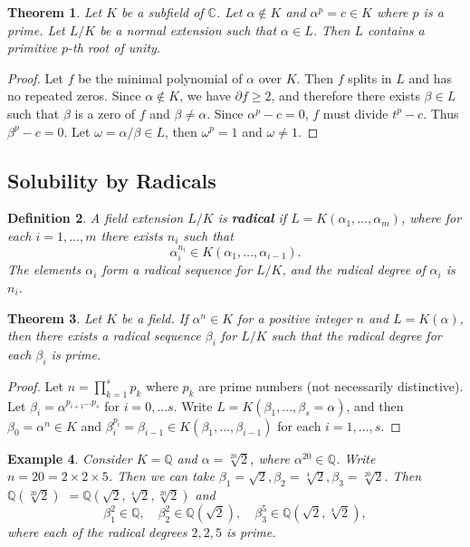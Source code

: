 \documentclass[12pt]{article}
\newtheorem{theorem}{Theorem}
\newtheorem{definition}[theorem]{Definition}
\newtheorem{example}[theorem]{Example}
\begin{document}
\begin{theorem} \label{thm:unity-3}
Let $K$ be a subfield of $\mathbb C$. Let $\alpha \notin K$ and $\alpha^p = c \in K$ where $p$ is a prime. Let $L / K$ be a normal extension such that $\alpha \in L$. Then $L$ contains a primitive $p$-th root of unity.
\end{theorem}

\begin{proof}
Let $f$ be the minimal polynomial of $\alpha$ over $K$. Then $f$ splits in $L$ and has no repeated zeros. Since $\alpha \notin K$, we have $\partial f \ge 2$, and therefore there exists $\beta \in L$ such that $\beta$ is a zero of $f$ and $\beta \neq \alpha$. Since $\alpha ^ p - c = 0$, $f$ must divide $t ^ p - c$. Thus $\beta^p - c = 0$. Let $\omega=\alpha / \beta \in L $, then $\omega^p=1$ and $\omega \neq 1$.
\end{proof}


\subsection{Solubility by Radicals}
\begin{definition} \label{def:radical-extension}
    A field extension $L / K$ is \textbf{radical} if $L=K\left(\alpha_1, \ldots, \alpha_m\right)$, where for each $i=1, \ldots, m$ there exists $n_i$ such that
$$
\alpha_i^{n_i} \in K\left(\alpha_1, \ldots, \alpha_{i-1}\right).
$$
The elements $\alpha_i$ form a radical sequence for $L / K$, and the radical degree of $\alpha_i$ is $n_i$.
\end{definition}

\begin{theorem} \label{thm:radical-single-prime}
    Let $K$ be a field. If $\alpha ^ n \in K$ for a positive integer $n$ and  $L = K (\alpha)$, then there exists a radical sequence $\beta_i$ for $L / K$ such that the radical degree for each $\beta_i$ is prime.
\end{theorem}

\begin{proof}
    Let $n = \prod_{k=1}^{s} p_{k}$ where $p_{k}$ are prime numbers (not necessarily distinctive). Let $\beta_{i} = \alpha^ {p_{i + 1} \dots  p_{s}}$ for $i = 0, \dots s$. Write $L = K(\beta_1,  \dots, \beta_s = \alpha)$, and then $\beta_0 = \alpha^n \in K$ and  $\beta_i ^ {p_i} = \beta_{i-1} \in K(\beta_1, \dots, \beta_{i - 1})$ for each $i  = 1, \dots, s$. 
\end{proof}

\begin{example}
    Consider $K  = \mathbb Q$ and $\alpha = \sqrt[20]{2}$, where $\alpha ^ {20} \in \mathbb Q$. Write $n = 20 =  2 \times 2 \times 5 $. Then we can take $\beta_1 = \sqrt 2, \beta_2 = \sqrt[4]{2}, \beta_3 = \sqrt[20]{2}$. Then $\mathbb Q(\sqrt[20]{2}) $ $= \mathbb Q(\sqrt{2}, \sqrt[4]{2}, \sqrt[20]{2})$ and 
    $$
    \beta_1 ^ 2 \in \mathbb Q, \quad \beta_2 ^ 2 \in \mathbb Q(\sqrt{2}), \quad \beta_3^5 \in \mathbb Q (\sqrt{2}, \sqrt[4]{2}),
    $$
    where each of the radical degrees $2, 2, 5$ is prime.
\end{example}
\end{document}

